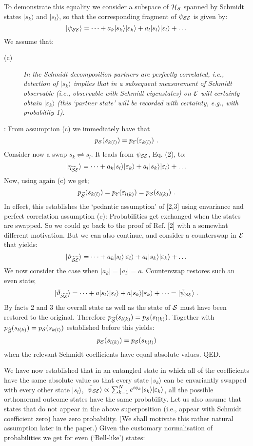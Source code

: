 \documentclass[aps,twocolumn,pra,epsfig]{revtex4}
\begin{document}
To demonstrate this equality we consider a subspace of ${\cal H_S}$ spanned by
Schmidt states $|s_k\rangle$ and $|s_l\rangle$, so that the corresponding
fragment of $\psi_{\cal SE}$ is given by:
$$ |\psi_{\cal SE}\rangle = \dots + a_k|s_k\rangle|\varepsilon_k\rangle
+a_l|s_l\rangle|\varepsilon_l\rangle + \dots $$
We assume that:
\begin{description}
\item [(c)] {\it In the Schmidt decomposition partners are perfectly
correlated, i.e., detection of $|s_k\rangle$ implies that in a subsequent
measurement of Schmidt observable (i.e., observable with Schmidt eigenstates)
on ${\cal E}$ will certainly obtain $|\varepsilon_k\rangle$
(this `partner state' will be recorded with certainty, e.g., with probability 1).}
\end{description}
: From assumption (c) we immediately have that
$$p_{\cal S}(s_{k(l)})= p_{\cal E} (\varepsilon_{k(l)}) \ . $$
Consider now a swap $s_k \rightleftharpoons s_l$. It leads from
$\psi_{\cal SE}$, Eq. (2), to:
$$|\eta_{\widetilde{\cal S}{\cal E}}\rangle=\dots+a_k|s_l\rangle
|\varepsilon_k\rangle +a_l|s_k\rangle|\varepsilon_l\rangle + \dots $$
Now, using again (c) we get;
$$p_{\widetilde {\cal S}} (s_{k(l)})
= p_{\cal E} (\varepsilon_{l(k)}) = p_{\cal S}(s_{l(k)})\ . $$
In effect, this establishes the `pedantic assumption' of [2,3] using envariance
and perfect correlation assumption (c): Probabilities get exchanged when
the states are swapped. So we could go back to the proof of Ref. [2] with
a somewhat different motivation. But we can also continue, and consider
a counterswap in ${\cal E}$ that yields:
$$|\vartheta_{\widetilde{\cal S}\widetilde{\cal 
E}}\rangle=\dots+a_k|s_l\rangle|\varepsilon_l\rangle
+a_l|s_k\rangle|\varepsilon_k\rangle + \dots $$
We now consider the case when $|a_k|=|a_l|=a$. Counterswap restores such
an even state;
$$|\bar \vartheta_{\widetilde{\cal S}\widetilde{\cal E}}\rangle
=\dots+a|s_l\rangle|\varepsilon_l\rangle
+a|s_k\rangle|\varepsilon_k\rangle + \dots = |\bar\psi_{\cal SE}\rangle \ . $$
By facts 2 and 3 the overall state as well as the state of ${\cal S}$ must have
been restored to the original. Therefore $ p_{\widetilde{\cal S}}(s_{l(k)}) =
p_{\cal S}(s_{l(k)})$. Together with $p_{\widetilde{\cal S}}(s_{l(k)})=
p_{\cal S}(s_{k(l)})$ established before this yields:
$$ p_{\cal S}(s_{l(k)}) = p_{\cal S}(s_{k(l)})  $$
when the relevant Schmidt coefficients have equal absolute values.
QED.

We have now established that in an entangled state in which all of
the coefficients have the same absolute value so that every state $|s_k\rangle$
can be envariantly swapped with every other state $|s_l\rangle$,
$|\bar\psi_{\cal SE}\rangle \propto \sum_{k=1}^N e^{i \phi_k} |s_k\rangle
|\varepsilon_k\rangle $, all the possible orthonormal outcome states
have the same probability. Let us also assume that states that
do not appear in the above superposition (i.e., appear with Schmidt
coefficient zero) have zero probability. (We shall motivate this rather natural
assumption later in the paper.) Given the customary normalisation
of probabilities we get for even (`Bell-like') states:
\end{document}
